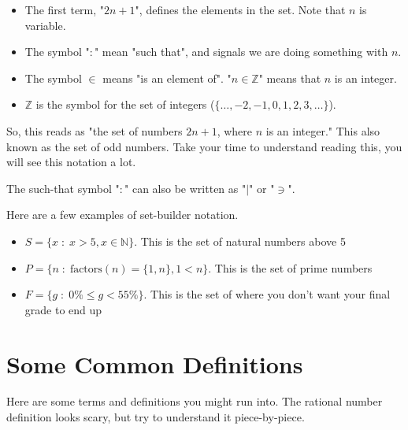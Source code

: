 \begin{itemize}
	\item The first term, "$2n+1$", defines the elements in the set. Note that $n$ is variable.
	\item The symbol "$:$" mean "such that", and signals we are doing something with $n$.
	\item The symbol $\in$ means "is an element of". "$n \in \mathbb{Z}$" means that $n$ is an integer.
	\item $\mathbb{Z}$ is the symbol for the set of integers ($\{\dots,-2,-1,0,1,2,3,\dots\}$).
\end{itemize}

So, this reads as "the set of numbers $2n+1$, where $n$ is an integer." This also known as the set of odd numbers. Take your time to understand reading this, you will see this notation a lot.

\begin{boxnotation*}{}{}
	The such-that symbol "$:$" can also be written as "$|$" or "$\ni$".
\end{boxnotation*}

\begin{boxexample}{}{}
	Here are a few examples of set-builder notation.

	\begin{itemize}
		\item $S = \{x \;:\; x > 5, x \in \mathbb{N}\}$. This is the set of natural numbers above 5
		\item $P = \{n \;:\; \text{factors}(n) = \{1,n\}, 1 < n\}$. This is the set of prime numbers
		\item $F = \{g \;:\; 0\% \leq g < 55\%\}$. This is the set of where you don't want your final grade to end up
	\end{itemize}
\end{boxexample}
	
\section{Some Common Definitions}

Here are some terms and definitions you might run into. The rational number definition looks scary, but try to understand it piece-by-piece.

